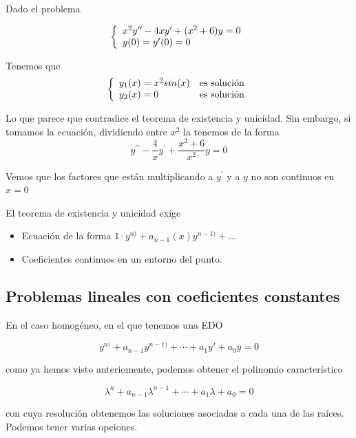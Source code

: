 \begin{example}
Dado el problema


\begin{equation}
\left\lbrace \begin{array}{l l}
	$$x^2y^{\prime\prime}-4xy^\prime+(x^2+6)y = 0$$\\
	y(0) = y^\prime(0) = 0
\end{array} \right. 
\end{equation}

Tenemos que
\begin{equation}
\left\lbrace \begin{array}{l l}
	y_1(x) = x^2sin(x) & \text{es solución}\\
	y_2(x) = 0 & \text{es solución}
\end{array} \right. 
\end{equation}

Lo que parece que contradice el teorema de existencia y unicidad. Sin embargo, si tomamos la ecuación, dividiendo entre $x^2$ la tenemos de la forma
$$y^{\prime\prime}-\frac{4}{x}y^\prime + \frac{x^2+6}{x^2}y = 0$$

Vemos que los factores que están multiplicando a $y^\prime$ y a $y$ no son continuos en $x=0$
\end{example}

\obs
El teorema de existencia y unicidad exige
\begin{itemize}
\item Ecuación de la forma $1\cdot y^{n)}+a_{n-1}(x)y^{n-1)}+\hdots$
\item Coeficientes continuos en un entorno del punto.
\end{itemize}

\subsection{Problemas lineales con coeficientes constantes}
\label{secEcHomoLinealConstante}
En el caso homogéneo, en el que tenemos una EDO

\[ y^{n)} + a_{n-1}y^{n-1)} + \dotsb + a_1y' + a_0 y = 0 \]

como ya hemos visto anteriomente, podemos obtener el polinomio característico

\[ λ^n + a_{n-1}λ^{n-1} + \dotsb + a_1λ + a_0 = 0 \]

con cuya resolución obtenemos las soluciones asociadas a cada una de las raíces. Podemos tener varias opciones.

